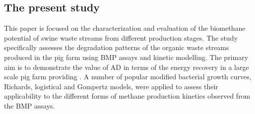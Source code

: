 \subsection{The present study}
This paper is focused on the characterization and evaluation of the biomethane potential of swine waste streams from different production stages. The study specifically assesses the degradation patterns of the organic waste streams produced in the pig farm using BMP assays and kinetic modelling. The primary aim is to demonstrate the value of AD in terms of the energy recovery in a large scale pig farm providing . A number of popular modified bacterial growth curves, Richards, logistical and Gompertz models, were applied to assess their applicability to the different forms of methane production kinetics observed from the BMP assays.